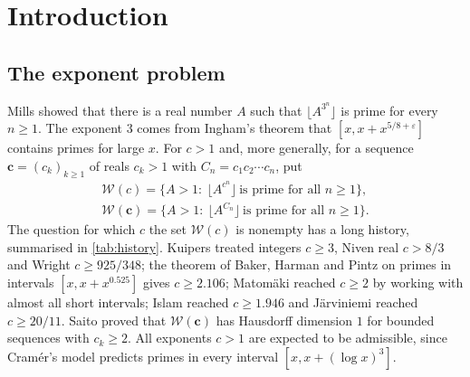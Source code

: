 \documentclass[11pt,a4paper]{article}
\theoremstyle{definition}
\newcommand{\W}{\mathcal{W}}
\newcommand{\fl}[1]{\lfloor #1\rfloor}
\newcommand{\eps}{\varepsilon}
\begin{document}
\section{Introduction}

\subsection{The exponent problem}
Mills \cite{Mil47} showed that there is a real number $A$ such that $\fl{A^{3^n}}$ is prime for every
$n\ge1$. The exponent $3$ comes from Ingham's theorem that $[x,x+x^{5/8+\eps}]$ contains primes for large $x$.
For $c>1$ and, more generally, for a sequence $\mathbf c=(c_k)_{k\ge1}$ of reals $c_k>1$ with
$C_n=c_1c_2\cdots c_n$, put
\begin{gather*}
 \W(c)=\{A>1:\ \fl{A^{c^n}}\ \text{is prime for all } n\ge1\},\\
 \W(\mathbf c)=\{A>1:\ \fl{A^{C_n}}\ \text{is prime for all } n\ge1\}.
\end{gather*}
The question for which $c$ the set $\W(c)$ is nonempty has a long history, summarised in
\cref{tab:history}. Kuipers \cite{Kui50} treated integers $c\ge 3$, Niven \cite{Niv51} real $c>8/3$ and
Wright \cite{Wri54} $c\ge 925/348$; the theorem of Baker, Harman and Pintz on primes in intervals
$[x,x+x^{0.525}]$ gives $c\ge 2.106$; Matomäki \cite{Mat10} reached $c\ge2$ by working with almost all short
intervals; Islam \cite{Isl15} reached $c\ge 1.946$ and Järviniemi \cite{Jar22} reached $c\ge 20/11$.
Saito \cite{Sai21} proved that $\W(\mathbf c)$ has Hausdorff dimension $1$ for bounded sequences with
$c_k\ge2$. All exponents $c>1$ are expected to be admissible, since Cramér's model predicts primes in
every interval $[x,x+(\log x)^{3}]$.
\end{document}
